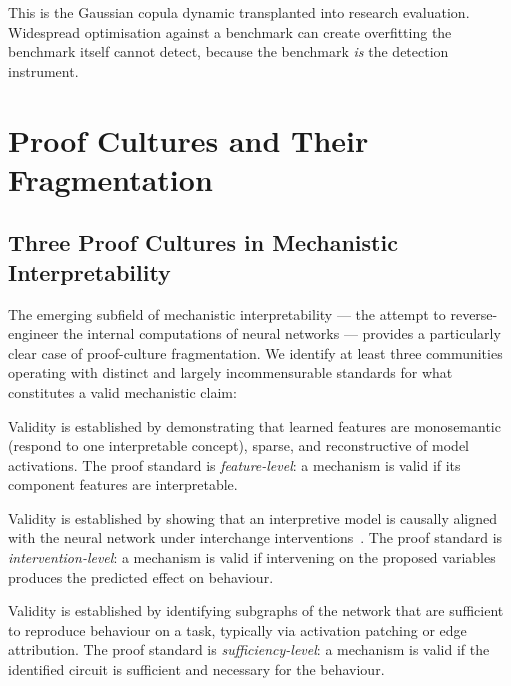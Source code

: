 \documentclass{article}
\begin{document}
This is the Gaussian copula dynamic transplanted into research evaluation. Widespread optimisation against a benchmark can create overfitting the benchmark itself cannot detect, because the benchmark \textit{is} the detection instrument.


\section{Proof Cultures and Their Fragmentation}
\label{sec:proof_cultures}

\subsection{Three Proof Cultures in Mechanistic Interpretability}

The emerging subfield of mechanistic interpretability --- the attempt to reverse-engineer the internal computations of neural networks --- provides a particularly clear case of proof-culture fragmentation. We identify at least three communities operating with distinct and largely incommensurable standards for what constitutes a valid mechanistic claim:

\begin{description}[leftmargin=*]
  \item[Sparse autoencoders (SAE).] Validity is established by demonstrating that learned features are monosemantic (respond to one interpretable concept), sparse, and reconstructive of model activations. The proof standard is \textit{feature-level}: a mechanism is valid if its component features are interpretable.
  \item[Causal abstraction.] Validity is established by showing that an interpretive model is causally aligned with the neural network under interchange interventions~\citep{geiger_causal_2021}. The proof standard is \textit{intervention-level}: a mechanism is valid if intervening on the proposed variables produces the predicted effect on behaviour.
  \item[Circuit discovery.] Validity is established by identifying subgraphs of the network that are sufficient to reproduce behaviour on a task, typically via activation patching or edge attribution. The proof standard is \textit{sufficiency-level}: a mechanism is valid if the identified circuit is sufficient and necessary for the behaviour.
\end{description}
\end{document}
